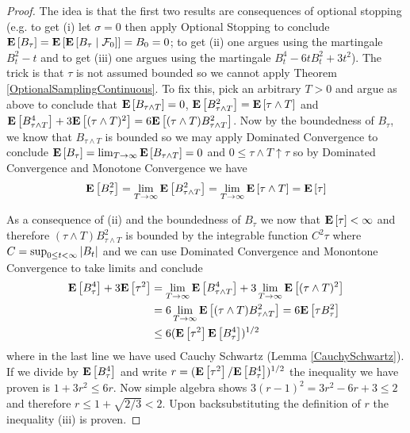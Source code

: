 \begin{proof}
The idea is that the first two results are consequences of optional
stopping (e.g. to get (i) let  $\sigma = 0$  
then apply Optional Stopping to conclude $\expectation{B_\tau} =
\expectation{\cexpectationlong{\mathcal{F}_0}{B_\tau}} = B_0 = 0$; to
get (ii) one argues using the martingale $B_t^2 - t$ and to get (iii)
one argues using the martingale $B_t^4 -6tB_t^2 + 3t^2$).  The trick is
that $\tau$ is not assumed bounded so we cannot apply Theorem
\ref{OptionalSamplingContinuous}.  To fix this, pick an arbitrary $T >
0$ and argue as above to conclude that $\expectation{B_{\tau \wedge
    T}} = 0$, $\expectation{B_{\tau \wedge
    T}^2} = \expectation{\tau \wedge T}$ and $\expectation{B_{\tau
    \wedge T}^4 } + 3\expectation{(\tau \wedge T)^2} = 6
  \expectation{(\tau \wedge T) B_{\tau \wedge T}^2}$.  Now by the boundedness of
$B_\tau$, we know that $B_{\tau \wedge T}$ is bounded so we may apply
Dominated Convergence to conclude $\expectation{B_\tau} = \lim_{T \to
  \infty} \expectation{B_{\tau \wedge T}} = 0$ and $0 \leq \tau \wedge T
\uparrow \tau$ so by Dominated Convergence and Monotone Convergence we
have
\begin{align*}
\expectation{B_\tau^2} = \lim_{T \to \infty} \expectation{B_{\tau
    \wedge T}^2} = \lim_{T \to \infty} \expectation{\tau \wedge T} = \expectation{\tau}
\end{align*}

As a consequence of (ii) and the boundedness of $B_\tau$ we now that
$\expectation{\tau} < \infty$ and therefore $(\tau  \wedge T)
B_{\tau\wedge T}^2$ is bounded
by the integrable function $C^2 \tau$ where $C = \sup_{0 \leq t <
  \infty} \abs{B_t}$ and we can use Dominated Convergence
and Monontone Convergence to take limits and conclude 
\begin{align*}
\expectation{B_{\tau}^4 } + 3\expectation{\tau^2} &= \lim_{T \to
  \infty} \expectation{B_{\tau
    \wedge T}^4 } + 3\lim_{T \to \infty} \expectation{(\tau \wedge
  T)^2} \\
&= 6
\lim_{T \to \infty}  \expectation{(\tau \wedge T) B_{\tau \wedge T}^2}
=  6 \expectation{\tau B_{\tau}^2} \\
&\leq 6 (\expectation{\tau^2} \expectation{B_\tau^4})^{1/2}
\end{align*}
where in the last line we have used Cauchy Schwartz (Lemma
\ref{CauchySchwartz}).  If we divide by $\expectation{B_\tau^4}$ and
write $r = (\expectation{\tau^2} /\expectation{B_\tau^4})^{1/2}$ the
inequality we have proven is $1 + 3r^2 \leq 6 r$.  Now simple algebra
shows 
$3(r -1)^2 = 3r^2 - 6r + 3 \leq 2$
and therefore $r \leq 1 + \sqrt{2/3} < 2$. Upon backsubstituting the
definition of $r$ the inequality (iii) is proven.
\end{proof}

